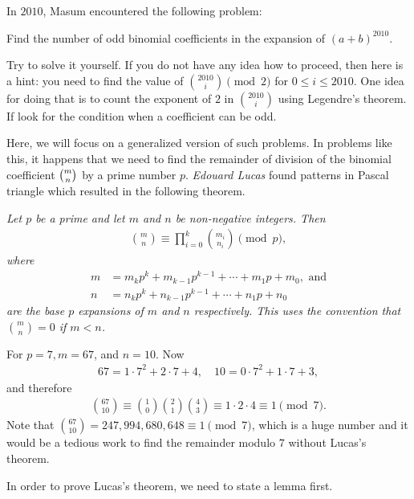 \documentclass[12pt]{subfile}
\begin{document}
In $2010$, Masum encountered the following problem:
	\begin{problem}
		Find the number of odd binomial coefficients in the expansion of $(a+b)^{2010}$.
	\end{problem}
Try to solve it yourself. If you do not have any idea how to proceed, then here is a hint: you need to find the value of $\binom{2010}{i}\pmod2$ for $0\leq i\leq2010$. One idea for doing that is to count the exponent of $2$ in $\binom{2010}{i}$ using Legendre's theorem. If look for the condition when a coefficient can be odd.

Here, we will focus on a generalized version of such problems. In problems like this, it happens that we need to find the remainder of division of the binomial coefficient $\tbinom{m}{n}$ by a prime number $p$. \textit{Edouard Lucas} found patterns in Pascal triangle which resulted in the following theorem.
	\begin{theorem}\slshape
		Let $p$ be a prime and let $m$ and $n$ be non-negative integers. Then
			\begin{align*}
				\binom{m}{n}\equiv\prod_{i=0}^k\binom{m_i}{n_i}\pmod p,
			\end{align*}
		where
			\begin{align*}
				m&=m_kp^k+m_{k-1}p^{k-1}+\cdots +m_1p+m_0, \text{ and}\\
				n&=n_kp^k+n_{k-1}p^{k-1}+\cdots +n_1p+n_0
			\end{align*}
		are the base $p$ expansions of $m$ and $n$ respectively. This uses the convention that $\binom{m}{n}=0$ if $m<n$.
	\end{theorem}
	
	\begin{example}
		For $p=7, m=67$, and $n=10$. Now
			\begin{align*}
				67 = 1 \cdot 7^2 + 2 \cdot 7 + 4, \quad 10 = 0 \cdot 7^2 + 1 \cdot 7 + 3,
			\end{align*}
		and therefore
			\begin{align*}
				\binom{67}{10}\equiv\binom{1}{0}\binom{2}{1}\binom{4}{3}\equiv 1 \cdot 2 \cdot 4 \equiv 1 \pmod 7.
			\end{align*}
		Note that $\binom{67}{10} = 247,994,680,648 \equiv 1 \pmod 7$, which is a huge number and it would be a tedious work to find the remainder modulo $7$ without Lucas's theorem.
	\end{example}
	
In order to prove Lucas's theorem, we need to state a lemma first.
	
\end{document}
